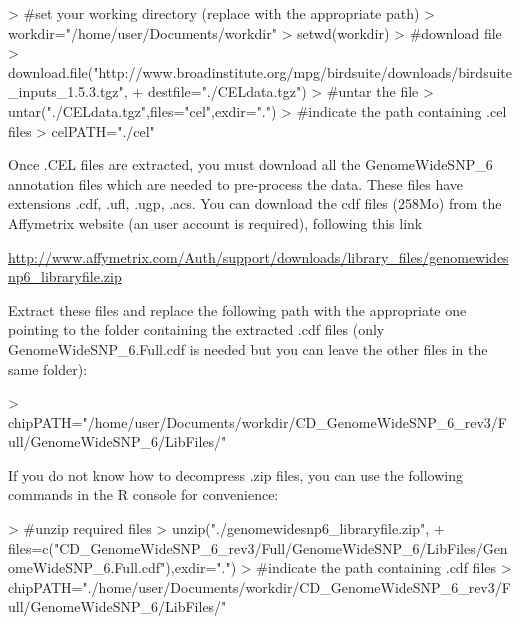 \documentclass[a4paper,10pt]{article}
\begin{document}
	
			\begin{scriptsize}
\begin{Schunk}
\begin{Sinput}
> #set your working directory (replace with the appropriate path)
> workdir="/home/user/Documents/workdir"
> setwd(workdir)
> #download file
> download.file("http://www.broadinstitute.org/mpg/birdsuite/downloads/birdsuite_inputs_1.5.3.tgz",
+ destfile="./CELdata.tgz")
> #untar the file
> untar("./CELdata.tgz",files="cel",exdir=".")
> #indicate the path containing .cel files
> celPATH="./cel"
\end{Sinput}
\end{Schunk}
			\end{scriptsize}


			Once .CEL files are extracted, you must download all the GenomeWideSNP\_6 annotation files which are needed to pre-process the data. These files have extensions .cdf, .ufl, .ugp, .acs. 
			You can download the cdf files (258Mo) from the Affymetrix website (an user account is required), following this link 
			\begin{small}
					\url{http://www.affymetrix.com/Auth/support/downloads/library_files/genomewidesnp6_libraryfile.zip}
			\end{small}
		
			Extract these files and replace the following path with the appropriate one pointing to the folder containing the extracted .cdf files (only GenomeWideSNP\_6.Full.cdf is needed but you can leave the other files in the same folder):	
		
\begin{Schunk}
\begin{Sinput}
> chipPATH="/home/user/Documents/workdir/CD_GenomeWideSNP_6_rev3/Full/GenomeWideSNP_6/LibFiles/"
\end{Sinput}
\end{Schunk}
			
			If you do not know how to decompress .zip files, you can use the following commands in the R console for convenience:
	
			\begin{scriptsize}
\begin{Schunk}
\begin{Sinput}
> #unzip required files
> unzip("./genomewidesnp6_libraryfile.zip",
+  files=c("CD_GenomeWideSNP_6_rev3/Full/GenomeWideSNP_6/LibFiles/GenomeWideSNP_6.Full.cdf"),exdir=".")
> #indicate the path containing .cdf files
> chipPATH="./home/user/Documents/workdir/CD_GenomeWideSNP_6_rev3/Full/GenomeWideSNP_6/LibFiles/"
\end{Sinput}
\end{Schunk}
			\end{scriptsize}
\end{document}
